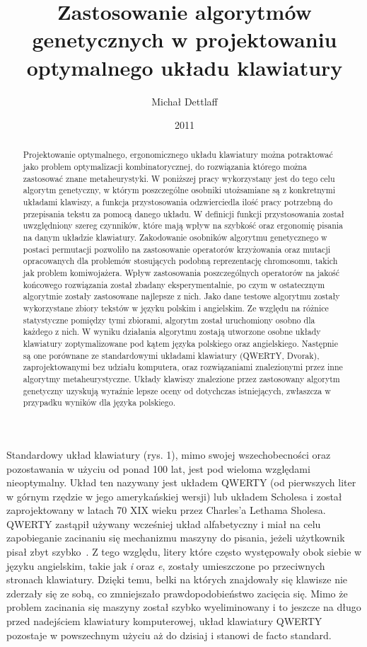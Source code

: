 \documentclass{xmgr}
\author   {Michał Dettlaff}
\title    {Zastosowanie algorytmów genetycznych w projektowaniu optymalnego układu klawiatury}
\date     {2011}
\begin{document}
\begin{abstract}
  Projektowanie optymalnego, ergonomicznego układu klawiatury można potraktować jako problem optymalizacji kombinatorycznej, do rozwiązania którego można zastosować znane metaheurystyki. W poniższej pracy wykorzystany jest do tego celu algorytm genetyczny, w którym poszczególne osobniki utożsamiane są z konkretnymi układami klawiszy, a funkcja przystosowania odzwierciedla ilość pracy potrzebną do przepisania tekstu za pomocą danego układu. W definicji funkcji przystosowania został uwzględniony szereg czynników, które mają wpływ na szybkość oraz ergonomię pisania na danym układzie klawiatury. Zakodowanie osobników algorytmu genetycznego w postaci permutacji pozwoliło na zastosowanie operatorów krzyżowania oraz mutacji opracowanych dla problemów stosujących podobną reprezentację chromosomu, takich jak problem komiwojażera. Wpływ zastosowania poszczególnych operatorów na jakość końcowego rozwiązania został zbadany eksperymentalnie, po czym w ostatecznym algorytmie zostały zastosowane najlepsze z nich. Jako dane testowe algorytmu zostały wykorzystane zbiory tekstów w języku polskim i angielskim. Ze względu na różnice statystyczne pomiędzy tymi zbiorami, algorytm został uruchomiony osobno dla każdego z nich. W wyniku działania algorytmu zostają utworzone osobne układy klawiatury zoptymalizowane pod kątem języka polskiego oraz angielskiego. Następnie są one porównane ze standardowymi układami klawiatury (QWERTY, Dvorak), zaprojektowanymi bez udziału komputera, oraz rozwiązaniami znalezionymi przez inne algorytmy metaheurystyczne. Układy klawiszy znalezione przez zastosowany algorytm genetyczny uzyskują wyraźnie lepsze oceny od dotychczas istniejących, zwłaszcza w przypadku wyników dla języka polskiego.
\end{abstract}

\maketitle
%
\introduction

Standardowy układ klawiatury (rys. 1), mimo swojej wszechobecności oraz pozostawania w użyciu od ponad 100 lat, jest pod wieloma względami nieoptymalny. Układ ten nazywany jest układem QWERTY (od pierwszych liter w górnym rzędzie w jego amerykańskiej wersji) lub układem Scholesa i został zaprojektowany w latach 70 XIX wieku przez Charles'a Lethama Sholesa. QWERTY zastąpił używany wcześniej układ alfabetyczny i miał na celu zapobieganie zacinaniu się mechanizmu maszyny do pisania, jeżeli użytkownik pisał zbyt szybko~\cite{Norman:1988:DOET}. Z tego względu, litery które często występowały obok siebie w języku angielskim, takie jak \emph{i} oraz \emph{e}, zostały umieszczone po przeciwnych stronach klawiatury. Dzięki temu, belki na których znajdowały się klawisze nie zderzały się ze sobą, co zmniejszało prawdopodobieństwo zacięcia się. Mimo że problem zacinania się maszyny został szybko wyeliminowany i to jeszcze na długo przed nadejściem klawiatury komputerowej, układ klawiatury QWERTY pozostaje w powszechnym użyciu aż do dzisiaj i stanowi de facto standard.
\end{document}
